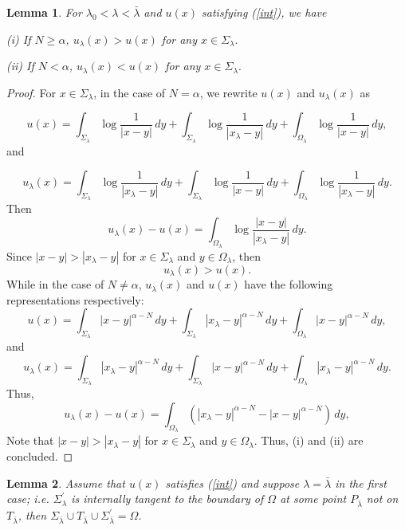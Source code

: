\documentclass[12pt]{amsproc}
\theoremstyle{plain}
\numberwithin{equation}{section}
\newtheorem{lem}{Lemma}[section]
\begin{document}
 \begin{lem}
For
 $\lambda_0<\lambda<\bar\lambda$ and $u(x)$ satisfying (\ref{int}), we have

(i) If $N\geq \alpha$, $u_\lambda(x)>u(x)$ for any $x\in
\Sigma_\lambda.$
\medskip

(ii) If $N< \alpha$, $u_\lambda(x)<u(x)$ for any $x\in
\Sigma_\lambda.$

\end{lem}

\begin{proof}
 For $x\in\Sigma_\lambda$, in the case of $N=\alpha$, we rewrite
$u(x)$ and $u_\lambda(x)$ as

$$u(x)=\int_{\Sigma_\lambda} \log\frac{1}{|x-y|} \,dy + \int_{\Sigma_\lambda} \log\frac{1}{|x_\lambda-y|} \,dy
+\int_{\Omega_\lambda} \log\frac{1}{|x-y|} \,dy,$$ and

$$u_\lambda(x)=\int_{\Sigma_\lambda} \log\frac{1}{|x_\lambda-y|} \,dy + \int_{\Sigma_\lambda} \log\frac{1}{|x-y|} \,dy
+\int_{\Omega_\lambda} \log\frac{1}{|x_\lambda-y|} \,dy.$$ Then
\begin{equation}
u_\lambda(x)-u(x)=\int_{\Omega_\lambda}\log\frac{|x-y|}{|x_\lambda-y|}
\,dy. \label{Com}
\end{equation}
 Since $|x-y|>|x_\lambda-y|$ for $x\in \Sigma_\lambda$ and
$y\in \Omega_\lambda$, then
 $$u_\lambda(x)>u(x).$$
 While in the case of $ N\not =\alpha$, $u_\lambda(x)$ and $u(x)$ have the
 following representations respectively:
 $$u(x)=\int_{\Sigma_\lambda}|x-y|^{\alpha-N}\,dy + \int_{\Sigma_\lambda} |x_\lambda-y|^{\alpha-N} \,dy
+\int_{\Omega_\lambda} |x-y|^{\alpha-N} \,dy,$$
 and
 $$u_\lambda(x)=\int_{\Sigma_\lambda}|x_\lambda-y|^{\alpha-N}\,dy + \int_{\Sigma_\lambda} |x-y|^{\alpha-N} \,dy
+\int_{\Omega_\lambda} |x_\lambda-y|^{\alpha-N} \,dy.$$ Thus,
\begin{equation}
u_\lambda(x)-u(x)=\int_{\Omega_\lambda}(|x_\lambda-y|^{\alpha-N}-|x-y|^{\alpha-N})
\,dy, \label{Com1}
\end{equation}
 Note that  $|x-y|>|x_\lambda-y|$ for $x\in \Sigma_\lambda$ and
$y\in \Omega_\lambda$. Thus, (i) and (ii) are concluded.

\end{proof}

\begin{lem}
Assume that $u(x)$ satisfies (\ref{int}) and suppose
$\lambda=\bar\lambda$ in the first case; i.e.
$\Sigma^\prime_\lambda$ is internally tangent to the boundary of
$\Omega$ at some point $P_{\bar\lambda}$ not on $T_{\bar\lambda}$,
then $\Sigma_{\bar\lambda}\cup
T_{\bar\lambda}\cup\Sigma^\prime_{\bar\lambda}=\Omega$. \label{le}
\end{lem}
\end{document}
